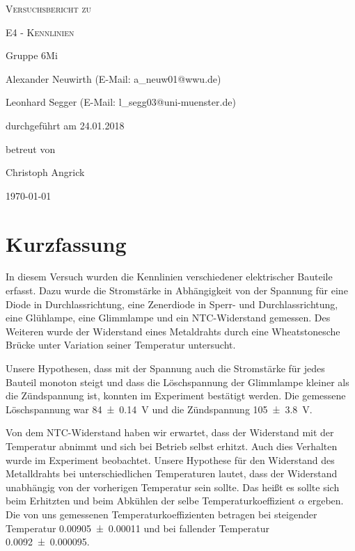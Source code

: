 \documentclass[
	a4paper,
	12pt,
	pagesize,
	ngerman
]{scrartcl}
\begin{document}
	
	\begin{titlepage}
		\centering
		{\scshape\LARGE Versuchsbericht zu \par}
		\vspace{1cm}
		{\scshape\huge E4 - Kennlinien \par} %
		\vspace{2.5cm}
		{\LARGE Gruppe 6Mi \par}
		\vspace{0.5cm}
		
		{\large Alexander Neuwirth (E-Mail: a\_neuw01@wwu.de) \par}
		{\large Leonhard Segger (E-Mail: l\_segg03@uni-muenster.de) \par}
		\vfill
		
		durchgeführt am 24.01.2018\par %
		betreut von\par
		{\large Christoph Angrick} %
		
		\vfill
		
		{\large \today\par}
	\end{titlepage}
	\tableofcontents
	\newpage


	\section{Kurzfassung}
	In diesem Versuch wurden die Kennlinien verschiedener elektrischer Bauteile erfasst.
	Dazu wurde die Stromstärke in Abhängigkeit von der Spannung für eine Diode in Durchlassrichtung, eine Zenerdiode in Sperr- und Durchlassrichtung, eine Glühlampe, eine Glimmlampe und ein NTC-Widerstand gemessen. 
	Des Weiteren wurde der Widerstand eines Metaldrahts durch eine Wheatstonesche Brücke unter Variation seiner Temperatur untersucht.

	Unsere Hypothesen, dass mit der Spannung auch die Stromstärke für jedes Bauteil monoton steigt und dass die Löschspannung der Glimmlampe kleiner als die Zündspannung ist, konnten im Experiment bestätigt werden.
	Die gemessene Löschspannung war \SI{84\pm 0,14}{V} und die Zündspannung \SI{105\pm3,8}{V}.

	Von dem NTC-Widerstand haben wir erwartet, dass der Widerstand mit der Temperatur abnimmt und sich bei Betrieb selbst erhitzt. 
	Auch dies Verhalten wurde im Experiment beobachtet. %
	Unsere Hypothese für den Widerstand des Metalldrahts bei unterschiedlichen Temperaturen lautet, dass der Widerstand unabhängig von der vorherigen Temperatur sein sollte. 
	Das heißt es sollte sich beim Erhitzten und beim Abkühlen der selbe Temperaturkoeffizient $\alpha$ ergeben.
	Die von uns gemessenen Temperaturkoeffizienten betragen bei steigender Temperatur \SI{0,00905\pm 0,00011}{} und bei fallender Temperatur \SI{0,0092\pm 0,000095}{}.
\end{document}
